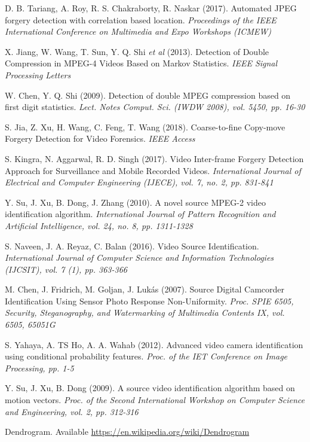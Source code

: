 \begin{thebibliography}{11}
D. B. Tariang, A. Roy, R. S. Chakraborty, R. Naskar (2017). Automated JPEG forgery detection with correlation based location. \textit{Proceedings of the IEEE International Conference on Multimedia and Expo Workshops (ICMEW)}

X. Jiang, W. Wang, T. Sun, Y. Q. Shi \textit{et al} (2013). Detection of Double Compression in MPEG-4 Videos Based on Markov Statistics. \textit{IEEE Signal Processing Letters}

W. Chen, Y. Q. Shi (2009). Detection of double MPEG compression based on first digit statistics. \textit{Lect. Notes Comput. Sci. (IWDW 2008), vol. 5450, pp. 16-30}

S. Jia, Z. Xu, H. Wang, C. Feng, T. Wang (2018). Coarse-to-fine Copy-move Forgery Detection for Video Forensics. \textit{IEEE Access}

S. Kingra, N. Aggarwal, R. D. Singh (2017). Video Inter-frame Forgery Detection Approach for Surveillance and Mobile Recorded Videos. \textit{International Journal of Electrical and Computer Engineering (IJECE), vol. 7, no. 2, pp. 831-841}

Y. Su, J. Xu, B. Dong, J. Zhang (2010). A novel source MPEG-2 video identification algorithm. \textit{International Journal of Pattern Recognition and Artificial Intelligence, vol. 24, no. 8, pp. 1311-1328}

S. Naveen, J. A. Reyaz, C. Balan (2016). Video Source Identification. \textit{International Journal of Computer Science and Information Technologies (IJCSIT), vol. 7 (1), pp. 363-366}

M. Chen, J. Fridrich, M. Goljan, J. Lukás (2007). Source Digital Camcorder Identification Using Sensor Photo Response Non-Uniformity. \textit{Proc. SPIE 6505, Security, Steganography, and Watermarking of Multimedia Contents IX, vol. 6505, 65051G}

S. Yahaya, A. TS Ho, A. A. Wahab (2012). Advanced video camera identification using conditional probability features. \textit{Proc. of the IET Conference on Image Processing, pp. 1-5}

Y. Su, J. Xu, B. Dong (2009). A source video identification algorithm based on motion vectors. \textit{Proc. of the Second International Workshop on Computer Science and Engineering, vol. 2, pp. 312-316}

Dendrogram. Available \url{https://en.wikipedia.org/wiki/Dendrogram}

\end{thebibliography}
